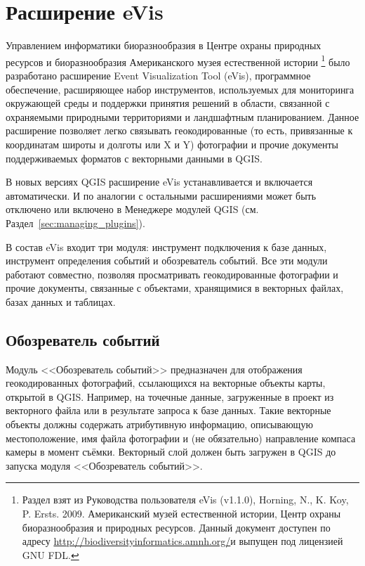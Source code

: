 

\section{Расширение eVis}\label{sec:evis}

Управлением информатики биоразнообразия в Центре охраны природных ресурсов
и биоразнообразия Американского музея естественной истории \footnote{Раздел
взят из Руководства пользователя eVis (v1.1.0), Horning, N., K. Koy, P.
Ersts. 2009. Американский музей естественной истории, Центр охраны
биоразнообразия и природных ресурсов. Данный документ доступен по адресу
\url{http://biodiversityinformatics.amnh.org/}и выпущен под лицензией GNU FDL.}
было разработано расширение Event Visualization Tool (eVis),
программное обеспечение, расширяющее набор инструментов, используемых для
мониторинга окружающей среды и поддержки принятия решений в области,
связанной с охраняемыми природными территориями и ландшафтным планированием.
Данное расширение позволяет легко связывать геокодированные (то есть,
привязанные к координатам широты и долготы или X и Y) фотографии и прочие
документы поддерживаемых форматов с векторными данными в QGIS.

В новых версиях QGIS расширение eVis устанавливается и включается
автоматически. И по аналогии с остальными расширениями может быть
отключено или включено в Менеджере модулей QGIS (см. Раздел~\ref{sec:managing_plugins}).

В состав eVis входит три модуля: инструмент подключения к базе данных,
инструмент определения событий и обозреватель событий. Все эти модули
работают совместно, позволяя просматривать геокодированные фотографии
и прочие документы, связанные с объектами, хранящимися в векторных файлах,
базах данных и таблицах.

\subsection{Обозреватель событий}\label{evis_browser}

Модуль <<Обозреватель событий>> предназначен для отображения геокодированных
фотографий, ссылающихся на векторные объекты карты, открытой в QGIS. Например,
на точечные данные, загруженные в проект из векторного файла или в результате
запроса к базе данных. Такие векторные объекты должны содержать атрибутивную
информацию, описывающую местоположение, имя файла фотографии и (не
обязательно) направление компаса камеры в момент съёмки. Векторный слой
должен быть загружен в QGIS до запуска модуля <<Обозреватель событий>>.

